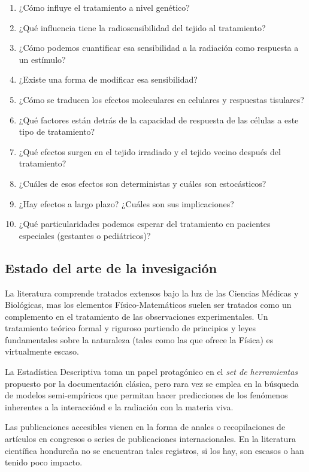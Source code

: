 \documentclass[12pt,letterpaper]{article}
\begin{document}
		\begin{enumerate}
			\item ¿Cómo influye el tratamiento a nivel genético? 
			\item ¿Qué influencia tiene la radiosensibilidad del tejido al tratamiento? 
			\item ¿Cómo podemos cuantificar esa sensibilidad a la radiación como respuesta a un estímulo? 
			\item ¿Existe una forma de modificar esa sensibilidad? 
			\item ¿Cómo se traducen los efectos moleculares en celulares y respuestas tisulares? 
			\item ¿Qué factores están detrás de la capacidad de respuesta de las células a este tipo de tratamiento?
			\item ¿Qué efectos surgen en el tejido irradiado y el tejido vecino después del tratamiento? 
			\item ¿Cuáles de esos efectos son deterministas y cuáles son estocásticos?
			\item ¿Hay efectos a largo plazo? ¿Cuáles son sus implicaciones? 
			\item ¿Qué particularidades podemos esperar del tratamiento en pacientes especiales (gestantes o pediátricos)?
		\end{enumerate}
		\subsection*{Estado del arte de la invesigación}
		La literatura comprende tratados extensos bajo la luz de las Ciencias Médicas y Biológicas, mas los elementos Físico-Matemáticos suelen ser tratados como un complemento en el tratamiento de las observaciones experimentales. Un tratamiento teórico formal y riguroso partiendo de principios y leyes fundamentales sobre la naturaleza (tales como las que ofrece la Física) es virtualmente escaso. 
		
		La Estadística Descriptiva toma un papel protagónico en el \textit{set de herramientas} propuesto por la documentación clásica, pero rara vez se emplea en la búsqueda de modelos semi-empíricos que permitan hacer predicciones de los fenómenos inherentes a la interacciónd e la radiación con la materia viva. 
		
		Las publicaciones accesibles vienen en la forma de anales o recopilaciones de artículos en congresos o series de publicaciones internacionales. En la literatura científica hondureña no se encuentran tales registros, si los hay, son escasos o han tenido poco impacto. 
		
\end{document}
